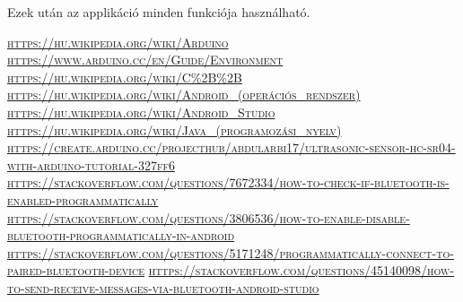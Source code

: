 \documentclass[]{thesis-ekf}
\theoremstyle{definition}
\begin{document}
Ezek után az applikáció minden funkciója használható.
\begin{thebibliography}{1}
	  \textsc{\url{https://hu.wikipedia.org/wiki/Arduino}}
	 \textsc{\url{https://www.arduino.cc/en/Guide/Environment}}
	\textsc{\url{https://hu.wikipedia.org/wiki/C\%2B\%2B}}
	\textsc{\url{https://hu.wikipedia.org/wiki/Android\_(operációs\_rendszer)}}
	\textsc{\url{https://hu.wikipedia.org/wiki/Android\_Studio}}
	\textsc{\url{https://hu.wikipedia.org/wiki/Java\_(programozási\_nyelv)}}
	\textsc{\url{https://create.arduino.cc/projecthub/abdularbi17/ultrasonic-sensor-hc-sr04-with-arduino-tutorial-327ff6}}
	\textsc{\url{https://stackoverflow.com/questions/7672334/how-to-check-if-bluetooth-is-enabled-programmatically}}
	\textsc{\url{https://stackoverflow.com/questions/3806536/how-to-enable-disable-bluetooth-programmatically-in-android}}
	\textsc{\url{https://stackoverflow.com/questions/5171248/programmatically-connect-to-paired-bluetooth-device}}
	\textsc{\url{https://stackoverflow.com/questions/45140098/how-to-send-receive-messages-via-bluetooth-android-studio}}
\end{thebibliography}
\end{document}

